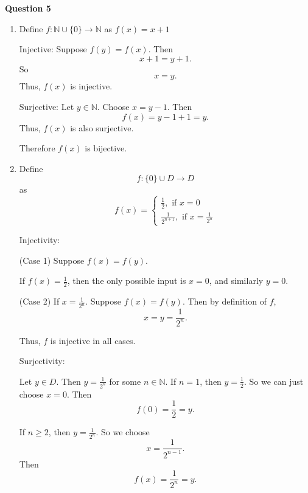 \documentclass[12pt]{article}
\begin{document}
\noindent{} \textbf{Question 5}
\begin{enumerate}
      \item [(a)]
            Define $f: \mathbb{N} \cup \{0\} \rightarrow \mathbb{N}$ as $f(x) = x + 1$

            Injective: Suppose $f(y) = f(x)$.
            Then
            \[
                  x + 1 = y + 1.
            \]
            So
            \[
                  x = y.
            \]
            Thus, $f(x)$ is injective.

            Surjective:
            Let $y \in \mathbb{N}$.
            Choose $x = y - 1$. Then
            \[
                  f(x) = y - 1 + 1 = y.
            \]
            Thus, $f(x)$ is also surjective.

            Therefore $f(x)$ is bijective.

      \item [(b)]
            Define
            \[
                  f:\{0\}\cup D\to D
            \]
            as
            \[
                  f(x) =
                  \begin{cases}
                        \frac{1}{2}, \text{ if } x = 0 \\
                        \frac{1}{2^{n+1}}, \text{ if }x = \frac{1}{2^n}
                  \end{cases}
            \]

            Injectivity:

            (Case 1) Suppose $f(x)=f(y)$.

            If $f(x)=\frac12$, then the only possible input is $x=0$,
            and similarly $y=0$.

            (Case 2) If $x = \frac{1}{2^n}$.
            Suppose $f(x) = f(y)$.
            Then by definition of $f$,
            \[
                  x = y = \frac{1}{2^n}.
            \]

            Thus, $f$ is injective in all cases.

            Surjectivity:

            Let $y \in D$. Then $y = \frac{1}{2^n}$ for some $n \in \mathbb{N}$.
            If $n = 1$, then $y = \frac{1}{2}$. So we can just choose $x = 0$.
            Then
            \[
                  f(0) = \frac{1}{2} = y.
            \]

            If $n \geq 2$, then $y = \frac{1}{2^n}$. So we choose
            \[
                  x = \frac{1}{2^{n-1}}.
            \]
            Then
            \[
                  f(x) = \frac{1}{2^n} = y.
            \]


\end{enumerate}
\end{document}
